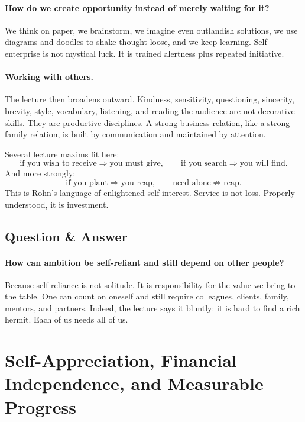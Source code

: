 \paragraph{How do we create opportunity instead of merely waiting for it?}
We think on paper, we brainstorm, we imagine even outlandish solutions, we use diagrams and doodles to shake thought loose, and we keep learning. Self-enterprise is not mystical luck. It is trained alertness plus repeated initiative.

\paragraph{Working with others.}
The lecture then broadens outward. Kindness, sensitivity, questioning, sincerity, brevity, style, vocabulary, listening, and reading the audience are not decorative skills. They are productive disciplines. A strong business relation, like a strong family relation, is built by communication and maintained by attention.

Several lecture maxims fit here:
\begin{equation}
\text{if you wish to receive} \Rightarrow \text{you must give},
\qquad
\text{if you search} \Rightarrow \text{you will find}.
\end{equation}
And more strongly:
\begin{equation}
\text{if you plant} \Rightarrow \text{you reap},
\qquad
\text{need alone} \not\Rightarrow \text{reap}.
\end{equation}
This is Rohn's language of enlightened self-interest. Service is not loss. Properly understood, it is investment.

\subsection{Question \& Answer}

\paragraph{How can ambition be self-reliant and still depend on other people?}
Because self-reliance is not solitude. It is responsibility for the value we bring to the table. One can count on oneself and still require colleagues, clients, family, mentors, and partners. Indeed, the lecture says it bluntly: it is hard to find a rich hermit. Each of us needs all of us.

\section{Self-Appreciation, Financial Independence, and Measurable Progress}

